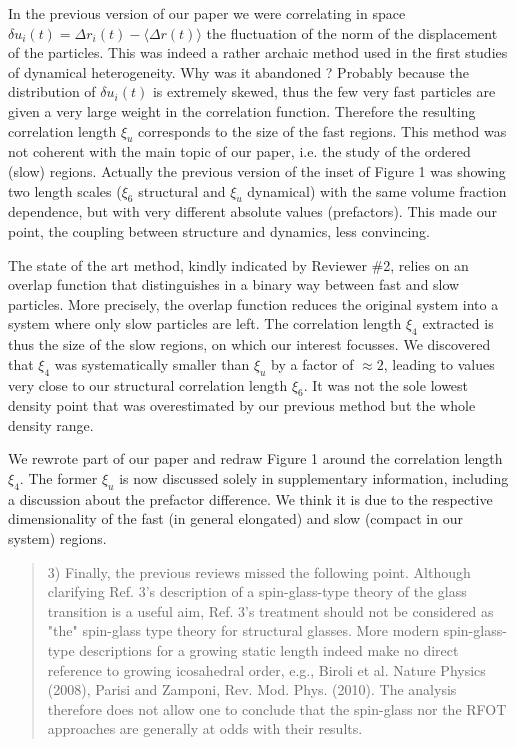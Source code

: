 \documentclass[10pt,a4paper]{letter}
\begin{document}
\begin{letter}{}
In the previous version of our paper we were correlating in space $\delta u_i(t) = \Delta r_i(t)-\langle\Delta r(t)\rangle$ the fluctuation of the norm of the displacement of the particles. This was indeed a rather archaic method used in the first studies of dynamical heterogeneity. Why was it abandoned ? Probably because the distribution of $\delta u_i(t)$ is extremely skewed, thus the few very fast particles are given a very large weight in the correlation function. Therefore the resulting correlation length $\xi_u$ corresponds to the size of the fast regions. This method was not coherent with the main topic of our paper, i.e. the study of the ordered (slow) regions. Actually the previous version of the inset of Figure 1 was showing two length scales ($\xi_6$ structural and $\xi_u$ dynamical) with the same volume fraction dependence, but with very different absolute values (prefactors). This made our point, the coupling between structure and dynamics, less convincing.

The state of the art method, kindly indicated by Reviewer \#2, relies on an overlap function that distinguishes in a binary way between fast and slow particles. More precisely, the overlap function reduces the original system into a system where only slow particles are left. The correlation length $\xi_4$ extracted is thus the size of the slow regions, on which our interest focusses. We discovered that $\xi_4$ was systematically smaller than $\xi_u$ by a factor of $\approx 2$, leading to values very close to our structural correlation length $\xi_6$. It was not the sole lowest density point that was overestimated by our previous method but the whole density range.

We rewrote part of our paper and redraw Figure 1 around the correlation length $\xi_4$. The former $\xi_u$ is now discussed solely in supplementary information, including a discussion about the prefactor difference. We think it is due to the respective dimensionality of the fast (in general elongated) and slow (compact in our system) regions.

\begin{quotation}
3) Finally, the previous reviews missed the following point. Although clarifying Ref. 3's description of a spin-glass-type theory of the glass transition is a useful aim, Ref. 3's treatment should not be considered as "the" spin-glass type theory for structural glasses. More modern spin-glass-type descriptions for a growing static length indeed make no direct reference to growing icosahedral order, e.g., Biroli et al. Nature Physics (2008), Parisi and Zamponi, Rev. Mod. Phys. (2010). The analysis therefore does not allow one to conclude that the spin-glass nor the RFOT approaches are generally at odds with their results.


\end{quotation}
\end{letter}
\end{document}

